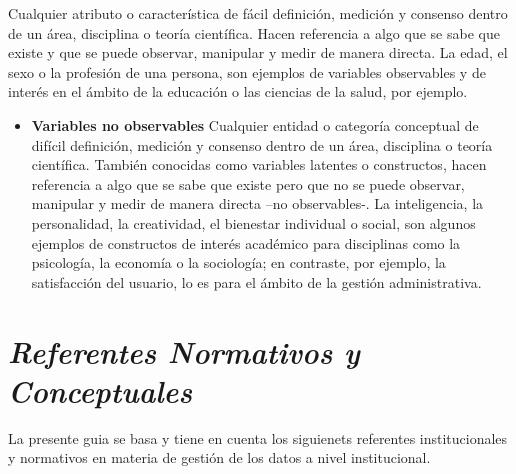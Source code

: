 \documentclass[
]{book}
\providecommand{\tightlist}{%
  \setlength{\itemsep}{0pt}\setlength{\parskip}{0pt}}
\begin{document}
Cualquier atributo o característica de fácil definición, medición y consenso dentro de un área, disciplina o teoría científica. Hacen referencia a algo que se sabe que existe y que se puede observar, manipular y medir de manera directa. La edad, el sexo o la profesión de una persona, son ejemplos de variables observables y de interés en el ámbito de la educación o las ciencias de la salud, por ejemplo.

\begin{itemize}
\tightlist
\item
  \textbf{Variables no observables}
  Cualquier entidad o categoría conceptual de difícil definición, medición y consenso dentro de un área, disciplina o teoría científica. También conocidas como variables latentes o constructos, hacen referencia a algo que se sabe que existe pero que no se puede observar, manipular y medir de manera directa --no observables-. La inteligencia, la personalidad, la creatividad, el bienestar individual o social, son algunos ejemplos de constructos de interés académico para disciplinas como la psicología, la economía o la sociología; en contraste, por ejemplo, la satisfacción del usuario, lo es para el ámbito de la gestión administrativa.
\end{itemize}

\hypertarget{referentes-normativos-y-conceptuales}{%
\chapter{\texorpdfstring{\textbf{\emph{Referentes Normativos y Conceptuales}}}{Referentes Normativos y Conceptuales}}\label{referentes-normativos-y-conceptuales}}

La presente guia se basa y tiene en cuenta los siguienets referentes institucionales y normativos en materia de gestión de los datos a nivel institucional.
\end{document}
